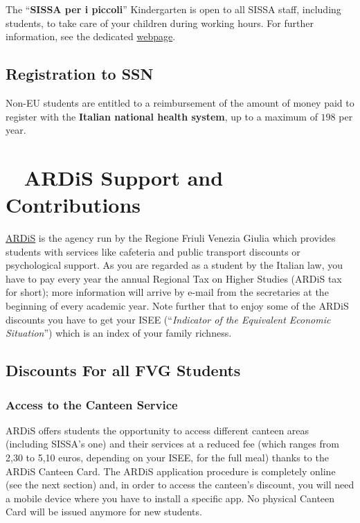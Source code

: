 \documentclass{sissavademecum}
\begin{document}
The ``\textbf{SISSA per i piccoli}{}'' Kindergarten is open to all SISSA staff, including students, to take care of your children during working hours. For further information, see the dedicated \href{https://www.sissa.it/kindergarten}{webpage}.
   
    
\section{Registration to SSN}

Non-EU students are entitled to a reimbursement of the amount of money paid to register with the \textbf{Italian national health system}, up to a maximum of \EUR{} $198$ per year.



\chapter{\texorpdfstring{\faTags\ }{} ARDiS Support and Contributions}
\hypertarget{ARDiS}{}
\label{chap:ARDiS}

\href{http://www.ardiss.fvg.it}{ARDiS} is the agency run by the Regione Friuli Venezia Giulia which provides students with services like cafeteria and public transport discounts or psychological support. As you are regarded as a student by the Italian law, you have to pay every year the annual Regional Tax on Higher Studies (ARDiS tax for short); more information will arrive by e-mail from the secretaries at the beginning of every academic year. Note further that to enjoy some of the ARDiS discounts you have to get your ISEE (``\emph{Indicator of the Equivalent Economic Situation}'') which is an index of your family richness.


\section{Discounts For all FVG Students}

\subsection{Access to the Canteen Service}

ARDiS offers students the opportunity to access different canteen areas (including SISSA's one) and their services at a reduced fee (which ranges from 2,30 to 5,10 euros, depending on your ISEE, for the full meal) thanks to the ARDiS Canteen Card. The ARDiS application procedure is completely online (see the next section) and, in order to access the canteen's discount, you will need a mobile device where you have to install a specific app. No physical Canteen Card will be issued anymore for new students.
\end{document}
